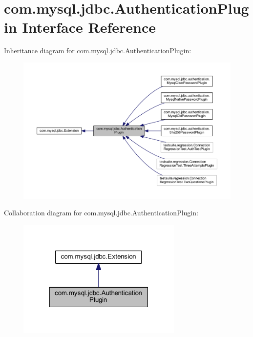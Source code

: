 \hypertarget{interfacecom_1_1mysql_1_1jdbc_1_1_authentication_plugin}{}\section{com.\+mysql.\+jdbc.\+Authentication\+Plugin Interface Reference}
\label{interfacecom_1_1mysql_1_1jdbc_1_1_authentication_plugin}


Inheritance diagram for com.\+mysql.\+jdbc.\+Authentication\+Plugin\+:\nopagebreak
\begin{figure}[H]
\begin{center}
\leavevmode
\includegraphics[width=350pt]{interfacecom_1_1mysql_1_1jdbc_1_1_authentication_plugin__inherit__graph}
\end{center}
\end{figure}


Collaboration diagram for com.\+mysql.\+jdbc.\+Authentication\+Plugin\+:\nopagebreak
\begin{figure}[H]
\begin{center}
\leavevmode
\includegraphics[width=231pt]{interfacecom_1_1mysql_1_1jdbc_1_1_authentication_plugin__coll__graph}
\end{center}
\end{figure}
